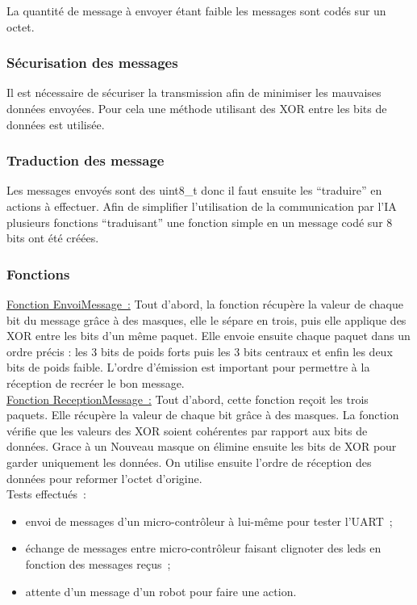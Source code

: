 \documentclass{article}
\begin{document}
La quantité de message à envoyer étant faible les messages sont codés sur un octet.

\subsubsection{Sécurisation des messages}

Il est nécessaire de sécuriser la transmission afin de minimiser les mauvaises données envoyées. Pour cela une méthode utilisant des XOR entre les bits de données est utilisée.

\subsubsection{Traduction des message}

Les messages envoyés sont des uint8\_t donc il faut ensuite les ``traduire'' en actions à effectuer. Afin de simplifier l'utilisation de la communication par l'IA plusieurs fonctions ``traduisant'' une fonction simple en un message codé sur 8 bits ont été créées.

\subsubsection{Fonctions}

\underline{Fonction EnvoiMessage~:} Tout d'abord, la fonction récupère la valeur de chaque bit du message grâce à des masques, elle le sépare en trois, puis elle applique des XOR entre les bits d'un même paquet. Elle envoie ensuite chaque paquet dans un ordre précis : les 3 bits de poids forts puis les 3 bits centraux et enfin les deux bits de poids faible. L'ordre d'émission est important pour permettre à la réception de recréer le bon message. \\

\underline{Fonction ReceptionMessage~:} Tout d'abord, cette fonction reçoit les trois paquets. Elle récupère la valeur de chaque bit grâce à des masques. La fonction vérifie que les valeurs des XOR soient cohérentes par rapport aux bits de données. Grace à un Nouveau masque on élimine ensuite les bits de XOR pour garder uniquement les données. On utilise ensuite l'ordre de réception des données pour reformer l'octet d'origine. \\

Tests effectués~: \\
\begin{itemize}
  \item envoi de messages d'un micro-contrôleur à lui-même pour tester l'UART~;
  \item échange de messages entre micro-contrôleur faisant clignoter des leds en fonction des messages reçus~;
  \item attente d'un message d'un robot pour faire une action.
\end{itemize}
\end{document}
